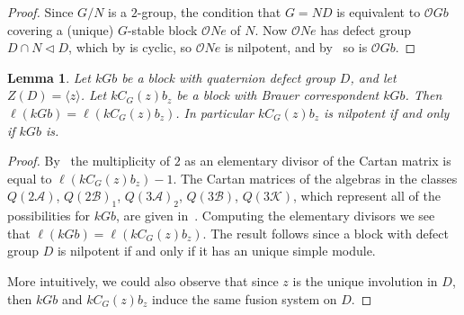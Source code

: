 \documentclass{amsart}
\theoremstyle{plain}\newtheorem{Theorem}{Theorem}[section]
\theoremstyle{plain}\newtheorem{Conjecture}[Theorem]{Conjecture}
\theoremstyle{plain}\newtheorem{Corollary}[Theorem]{Corollary}
\theoremstyle{plain}\newtheorem{Lemma}[Theorem]{Lemma}
\theoremstyle{plain}\newtheorem{Proposition}[Theorem]{Proposition}
\theoremstyle{definition}\newtheorem{Definition}[Theorem]{Definition}
\theoremstyle{definition}\newtheorem{Example}[Theorem]{Example}
\theoremstyle{definition}\newtheorem{Examples}[Theorem]{Examples}
\theoremstyle{definition}\newtheorem{Exercise}[Theorem]{Exercise}
\theoremstyle{definition}\newtheorem{Notation}[Theorem]{Notation}
\theoremstyle{definition}\newtheorem{Remark}[Theorem]{Remark}
\theoremstyle{definition}\newtheorem{Remarks}[Theorem]{Remarks}
\def\CO{{\mathcal{O}}}    \def\OPE{{\mathcal{O}(P\rtimes E)}}
\numberwithin{equation}{section}
\begin{document}
\begin{proof}
Since $G/N$ is a $2$-group, the condition that $G=ND$ is equivalent to $\CO Gb$ covering a (unique) $G$-stable block $\CO Ne$ of $N$. Now $\CO Ne$ has defect group $D \cap N \lhd D$, which by  is cyclic, so $\CO Ne$ is nilpotent, and by~\cite[Thm.~8.12.1]{LiBookII} so is $\CO Gb$.
\end{proof}

\begin{Lemma}
Let $kGb$ be a block with quaternion defect group $D$, and let $Z(D)=\langle z \rangle$. Let $kC_G(z)b_z$ be a block with Brauer correspondent $kGb$.  Then $\ell(kGb)=\ell(kC_G(z)b_z)$. In particular $kC_G(z)b_z$ is nilpotent if and only if $kGb$ is.    
\end{Lemma}

\begin{proof}
By~\cite[Prop.~3.2]{ol75} the multiplicity of $2$ as an elementary divisor of the Cartan matrix is equal to $\ell(kC_G(z)b_z)-1$. The Cartan matrices of the algebras in the classes $Q(2 \mathcal{A})$, $Q(2\mathcal{B})_1$, $Q(3\mathcal{A})_2$, $Q(3\mathcal{B})$, $Q(3\mathcal{K})$, which represent all of the possibilities for $kGb$, are given in~\cite{er90}. Computing the elementary divisors we see that $\ell(kGb)=\ell(kC_G(z)b_z)$. The result follows since a block with defect group $D$ is nilpotent if and only if it has an unique simple module.

More intuitively, we could also observe that since $z$ is the unique involution in $D$, then $kGb$ and $kC_G(z)b_z$ induce the same fusion system on $D$.
\end{proof}
\end{document}
